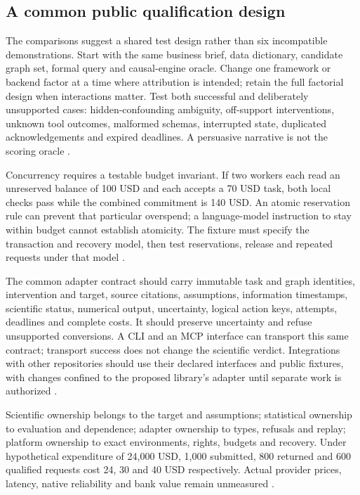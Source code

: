 \subsection{A common public qualification design}
The comparisons suggest a shared test design rather than six incompatible
demonstrations. Start with the same business brief, data dictionary,
candidate graph set, formal query and causal-engine oracle. Change one
framework or backend factor at a time where attribution is intended;
retain the full factorial design when interactions matter. Test both
successful and deliberately unsupported cases: hidden-confounding
ambiguity, off-support interventions, unknown tool outcomes, malformed
schemas, interrupted state, duplicated acknowledgements and expired
deadlines. A persuasive narrative is not the scoring oracle
\citep{exec24_framework_contracts}.

Concurrency requires a testable budget invariant. If two workers each
read an unreserved balance of 100 USD and each accepts a 70 USD task,
both local checks pass while the combined commitment is 140 USD.
An atomic reservation rule can prevent that particular overspend;
a language-model instruction to stay within budget cannot establish
atomicity. The fixture must specify the transaction and recovery model,
then test reservations, release and repeated requests under that model
\citep{exec24_framework_contracts}.

The common adapter contract should carry immutable task and graph
identities, intervention and target, source citations, assumptions,
information timestamps, scientific status, numerical output, uncertainty,
logical action keys, attempts, deadlines and complete costs. It should
preserve uncertainty and refuse unsupported conversions. A CLI and an MCP
interface can transport this same contract; transport success does not
change the scientific verdict. Integrations with other repositories should
use their declared interfaces and public fixtures, with changes confined
to the proposed library's adapter until separate work is authorized
\citep{exec24_framework_contracts}.

Scientific ownership belongs to the target and assumptions; statistical
ownership to evaluation and dependence; adapter ownership to types,
refusals and replay; platform ownership to exact environments, rights,
budgets and recovery. Under hypothetical expenditure of 24,000 USD,
1,000 submitted, 800 returned and 600 qualified requests cost 24, 30 and
40 USD respectively. Actual provider prices, latency, native reliability
and bank value remain unmeasured
\citep{exec24_framework_contracts}.

